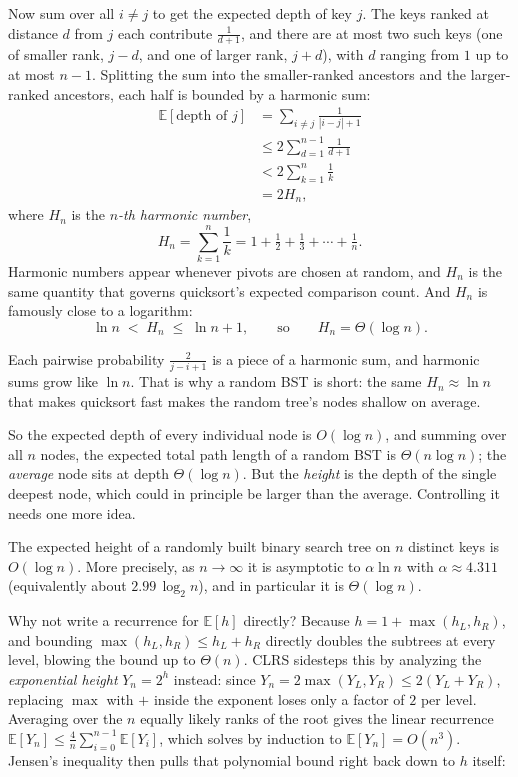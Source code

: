 Now sum over all $i \ne j$ to get the expected depth of key $j$. The keys ranked at
distance $d$ from $j$ each contribute $\tfrac{1}{d+1}$, and there are at most two such keys
(one of smaller rank, $j-d$, and one of larger rank, $j+d$), with $d$ ranging from $1$ up to
at most $n-1$. Splitting the sum into the smaller-ranked ancestors and the larger-ranked
ancestors, each half is bounded by a harmonic sum:
\begin{align*}
\mathbb{E}[\text{depth of } j]
   &= \sum_{i \ne j} \frac{1}{|i-j|+1} \\
   &\le 2\sum_{d=1}^{n-1} \frac{1}{d+1} \\
   &< 2\sum_{k=1}^{n} \frac{1}{k} \\
   &= 2H_n,
\end{align*}
where $H_n$ is the \emph{$n$-th harmonic number},
\[
H_n = \sum_{k=1}^{n} \frac{1}{k} = 1 + \tfrac12 + \tfrac13 + \cdots + \tfrac1n.
\]
Harmonic numbers appear whenever pivots are chosen at random, and $H_n$ is the same
quantity that governs quicksort's expected comparison count. And $H_n$ is famously close to a
logarithm:
\[
\ln n \;<\; H_n \;\le\; \ln n + 1, \qquad\text{so}\qquad H_n = \Theta(\log n).
\]

\begin{focusbox}
Each pairwise probability $\tfrac{2}{j-i+1}$ is a piece of a harmonic sum, and harmonic sums
grow like $\ln n$. That is why a random BST is short: the same $H_n \approx \ln
n$ that makes quicksort fast makes the random tree's nodes shallow on average.
\end{focusbox}

So the expected depth of every individual node is $O(\log n)$, and summing over all $n$ nodes,
the expected total path length of a random BST is $\Theta(n \log n)$; the \emph{average} node
sits at depth $\Theta(\log n)$. But the \emph{height} is the depth of the single deepest node,
which could in principle be larger than the average. Controlling it needs one more idea.

\begin{theorem}
\label{ch12:expected-height}
The expected height of a randomly built binary search tree on $n$ distinct keys is
$O(\log n)$. More precisely, as $n \to \infty$ it is asymptotic to $\alpha \ln n$ with
$\alpha \approx 4.311$ (equivalently about $2.99\,\log_2 n$), and in particular it is
$\Theta(\log n)$.
\end{theorem}

Why not write a recurrence for $\mathbb{E}[h]$ directly? Because $h = 1 + \max(h_L, h_R)$, and
bounding $\max(h_L, h_R) \le h_L + h_R$ directly doubles the subtrees at every level, blowing the
bound up to $\Theta(n)$. CLRS sidesteps this by analyzing the \emph{exponential height}
$Y_n = 2^{h}$ instead: since $Y_n = 2\max(Y_L, Y_R) \le 2(Y_L + Y_R)$, replacing $\max$ with $+$
inside the exponent loses only a factor of $2$ per level. Averaging over the $n$ equally likely
ranks of the root gives the linear recurrence
$\mathbb{E}[Y_n] \le \frac{4}{n}\sum_{i=0}^{n-1}\mathbb{E}[Y_i]$, which solves by induction to
$\mathbb{E}[Y_n] = O(n^3)$. Jensen's inequality then pulls that polynomial bound right back down
to $h$ itself:

